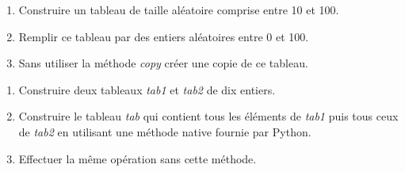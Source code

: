 \documentclass[a4paper,11pt]{article}
\begin{document}
\begin{Form}
\begin{exo}
\end{exo}
\begin{exo}
\begin{enumerate}
\item Construire un tableau de taille aléatoire comprise entre 10 et 100.
\item Remplir ce tableau par des entiers aléatoires entre 0 et 100.
\item Sans utiliser la méthode \emph{copy} créer une copie de ce tableau.
\end{enumerate}
\end{exo}
\begin{exo}
\begin{enumerate}
\item Construire deux tableaux \emph{tab1} et \emph{tab2} de dix entiers.
\item Construire le tableau \emph{tab} qui contient tous les éléments de \emph{tab1} puis tous ceux de \emph{tab2} en utilisant une méthode native fournie par Python.
\item Effectuer la même opération sans cette méthode.
\end{enumerate} 
\end{exo}
\end{Form}
\end{document}
